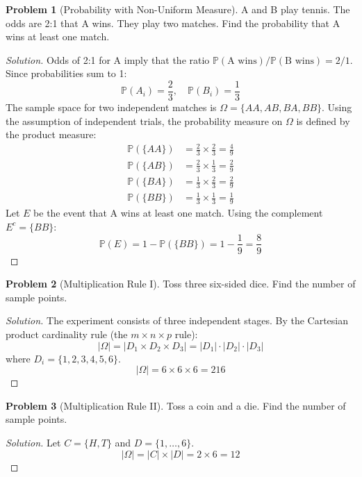 \documentclass[11pt, letterpaper]{article}
\theoremstyle{definition}
\newtheorem{example}{Problem}
\theoremstyle{remark}
\newcommand{\Prob}{\mathbb{P}}
\begin{document}
\begin{example}[Probability with Non-Uniform Measure]
    A and B play tennis. The odds are 2:1 that A wins. They play two matches. Find the probability that A wins at least one match.
\end{example}
\begin{proof}[Solution]
    Odds of 2:1 for A imply that the ratio $\Prob(\text{A wins}) / \Prob(\text{B wins}) = 2/1$. Since probabilities sum to 1:
    \[ \Prob(A_i) = \frac{2}{3}, \quad \Prob(B_i) = \frac{1}{3} \]
    The sample space for two independent matches is $\Omega = \{AA, AB, BA, BB\}$.
    Using the assumption of independent trials, the probability measure on $\Omega$ is defined by the product measure:
    \begin{align*}
        \Prob(\{AA\}) &= \frac{2}{3} \times \frac{2}{3} = \frac{4}{9} \\
        \Prob(\{AB\}) &= \frac{2}{3} \times \frac{1}{3} = \frac{2}{9} \\
        \Prob(\{BA\}) &= \frac{1}{3} \times \frac{2}{3} = \frac{2}{9} \\
        \Prob(\{BB\}) &= \frac{1}{3} \times \frac{1}{3} = \frac{1}{9}
    \end{align*}
    Let $E$ be the event that A wins at least one match. Using the complement $E^c = \{BB\}$:
    \[ \Prob(E) = 1 - \Prob(\{BB\}) = 1 - \frac{1}{9} = \frac{8}{9} \]
\end{proof}

\begin{example}[Multiplication Rule I]
    Toss three six-sided dice. Find the number of sample points.
\end{example}
\begin{proof}[Solution]
    The experiment consists of three independent stages. By the Cartesian product cardinality rule (the $m \times n \times p$ rule):
    \[ |\Omega| = |D_1 \times D_2 \times D_3| = |D_1| \cdot |D_2| \cdot |D_3| \]
    where $D_i = \{1, 2, 3, 4, 5, 6\}$.
    \[ |\Omega| = 6 \times 6 \times 6 = 216 \]
\end{proof}

\begin{example}[Multiplication Rule II]
    Toss a coin and a die. Find the number of sample points.
\end{example}
\begin{proof}[Solution]
    Let $C = \{H, T\}$ and $D = \{1, \dots, 6\}$. 
    \[ |\Omega| = |C| \times |D| = 2 \times 6 = 12 \]
\end{proof}
\end{document}
